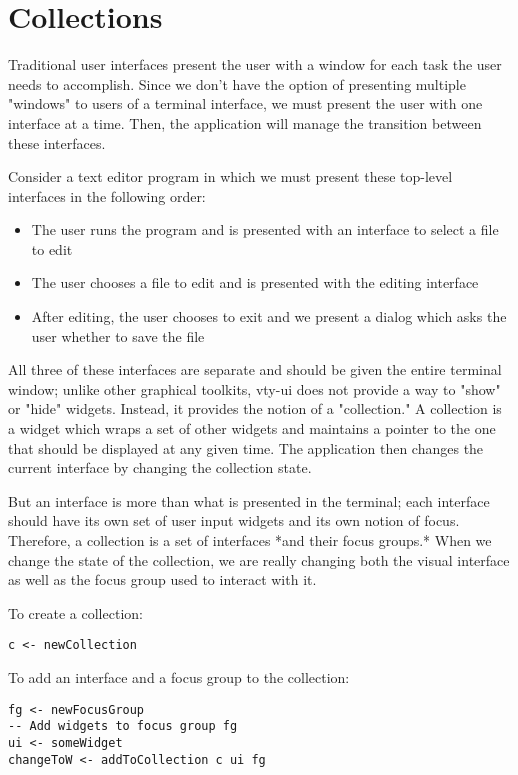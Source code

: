 \section{Collections}

Traditional user interfaces present the user with a window for each task
the user needs to accomplish.  Since we don't have the option of
presenting multiple "windows" to users of a terminal interface, we must
present the user with one interface at a time.  Then, the application
will manage the transition between these interfaces.

Consider a text editor program in which we must present these top-level
interfaces in the following order:

\begin{itemize}
\item The user runs the program and is presented with an interface to
      select a file to edit
\item The user chooses a file to edit and is presented with the
      editing interface
\item After editing, the user chooses to exit and we present a dialog
      which asks the user whether to save the file
\end{itemize}

All three of these interfaces are separate and should be given the
entire terminal window; unlike other graphical toolkits, vty-ui does not
provide a way to "show" or "hide" widgets.  Instead, it provides the
notion of a "collection."  A collection is a widget which wraps a set of
other widgets and maintains a pointer to the one that should be
displayed at any given time.  The application then changes the current
interface by changing the collection state.

But an interface is more than what is presented in the terminal; each
interface should have its own set of user input widgets and its own
notion of focus.  Therefore, a collection is a set of interfaces *and
their focus groups.*  When we change the state of the collection, we are
really changing both the visual interface as well as the focus group
used to interact with it.

To create a collection:

\begin{verbatim}
c <- newCollection
\end{verbatim}

To add an interface and a focus group to the collection:

\begin{verbatim}
fg <- newFocusGroup
-- Add widgets to focus group fg
ui <- someWidget
changeToW <- addToCollection c ui fg
\end{verbatim}

